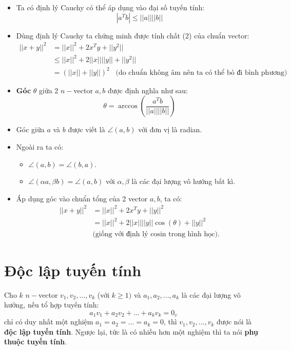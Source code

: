 \begin{itemize}
    \item Ta có định lý Cauchy có thể áp dụng vào đại số tuyến tính:
    $$
    |a^Tb| \leq ||a|| ||b||
    $$

    \item Dùng định lý Cauchy ta chứng minh được tính chất (2) của chuẩn vector:
    $$
    \begin{aligned}
        ||x+y||^2 &= ||x||^2 + 2x^Ty + ||y^2|| \\
        &\leq ||x||^2 + 2||x|| ||y|| + ||y^2|| \\
        &= (||x|| + ||y||)^2 \hspace{10pt} \text{(do chuẩn không âm nên ta có thể bỏ đi bình phương)}
    \end{aligned}
    $$

    \item \textbf{Góc} $\theta$ giữa 2 $n-$vector $a,b$ được định nghĩa như sau:
    $$
    \theta = \arccos \left( \dfrac{a^Tb}{||a|| ||b||} \right)
    $$

    \item Góc giữa $a$ và $b$ được viết là $\angle (a,b)$ với đơn vị là radian.

    \item Ngoài ra ta có:
    \begin{itemize}
        \item $\angle (a,b) = \angle (b,a)$.
        \item $\angle(\alpha a, \beta b) = \angle(a, b)$ với $\alpha, \beta$ là các đại lượng vô hướng bất kì.
    \end{itemize}

    \item Áp dụng góc vào chuẩn tổng của 2 vector $a, b$, ta có:
    $$
    \begin{aligned}
    ||x + y||^2 &= ||x||^2 + 2x^Ty + ||y||^2 \\
    &= ||x||^2 + 2||x||||y|| \cos(\theta) + ||y||^2 \\ 
    &\text{(giống với định lý cosin trong hình học)}.
    \end{aligned}
    $$
\end{itemize}

\section{Độc lập tuyến tính}

\begin{defivn}
    Cho  $k$ $n-$vector $v_1, v_2, ..., v_k$ (với $k \geq 1)$ và $a_1, a_2, ..., a_k$ là các đại lượng vô hướng, nếu tổ hợp tuyến tính:
    $$
    a_1v_1 + a_2v_2 + ... + a_kv_k = 0_{v}
    $$
    chỉ có duy nhất một nghiệm $a_1 = a_2 = ... = a_k = 0$, thì $v_1, v_2, ..., v_k$ được nói là \textbf{độc lập tuyến tính}. Ngược lại, tức là có nhiều hơn một nghiệm thì ta nói \textbf{phụ thuộc tuyến tính}.
\end{defivn}
\pagebreak

